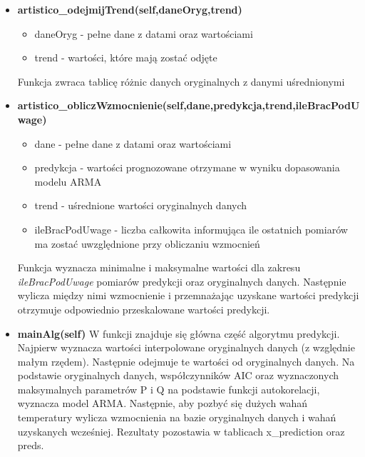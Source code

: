 \begin{itemize}
	\item \textbf{artistico\_odejmijTrend(self,daneOryg,trend)}
	\begin{itemize}
		\item daneOryg - pełne dane z datami oraz wartościami 
		\item trend - wartości, które mają zostać odjęte
	\end{itemize}
	Funkcja zwraca tablicę różnic danych oryginalnych z danymi uśrednionymi

	\item \textbf{artistico\_obliczWzmocnienie(self,dane,predykcja,trend,ileBracPodUwage)}
	\begin{itemize}
		\item dane - pełne dane z datami oraz wartościami
		\item predykcja - wartości prognozowane otrzymane w wyniku dopasowania modelu ARMA
		\item trend - uśrednione wartości oryginalnych danych
		\item ileBracPodUwage - liczba całkowita informująca ile ostatnich pomiarów ma zostać uwzględnione przy obliczaniu wzmocnień
	\end{itemize}
	Funkcja wyznacza minimalne i maksymalne wartości dla zakresu \textit{ileBracPodUwage} pomiarów predykcji oraz oryginalnych danych. Następnie wylicza między nimi wzmocnienie i przemnażając uzyskane wartości predykcji otrzymuje odpowiednio przeskalowane wartości predykcji. 

	\item \textbf{mainAlg(self)}\newline
	W funkcji znajduje się główna część algorytmu predykcji. Najpierw wyznacza wartości interpolowane oryginalnych danych (z względnie małym rzędem). Następnie odejmuje te wartości od oryginalnych danych. Na podstawie oryginalnych danych, współczynników AIC oraz wyznaczonych maksymalnych parametrów P i Q na podstawie funkcji autokorelacji, wyznacza model ARMA. Następnie, aby pozbyć się dużych wahań temperatury wylicza wzmocnienia na bazie oryginalnych danych i wahań uzyskanych wcześniej. Rezultaty pozostawia w tablicach x\_prediction oraz preds.
\end{itemize}
